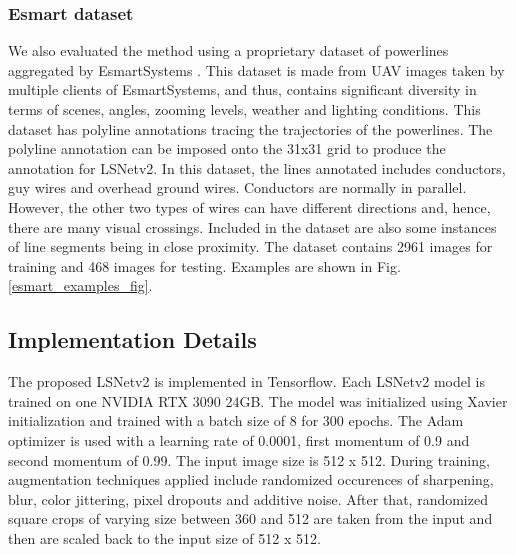 \documentclass[journal]{IEEEtran}
\newcommand{\commentM}[1]{\textbf{\textcolor{blue}{M: #1}}}
\begin{document}
\subsubsection{Esmart dataset}
We also evaluated the method using a proprietary dataset of powerlines aggregated by EsmartSystems \cite{esmart_website}. This dataset is made from UAV images taken by multiple clients of EsmartSystems, and thus, contains significant diversity in terms of scenes, angles, zooming levels, weather and lighting conditions. This dataset has polyline annotations tracing the trajectories of the powerlines. The polyline annotation can be imposed onto the 31x31 grid to produce the annotation for LSNetv2.
In this dataset, the lines annotated includes conductors, guy wires and overhead ground wires. Conductors are normally in parallel. However, the other two types of wires can have different directions and, hence, there are many visual crossings. Included in the dataset are also some instances of line segments being in close proximity. The dataset contains 2961 images for training and 468 images for testing. Examples are shown in Fig. \ref{esmart_examples_fig}.


\subsection{Implementation Details}

The proposed LSNetv2 is implemented in Tensorflow. Each LSNetv2 model is trained on one NVIDIA RTX 3090 24GB. The model was initialized using Xavier initialization \cite{xavier} and trained with a batch size of 8 for 300 epochs. The Adam optimizer \cite{adam} is used with a learning rate of 0.0001, first momentum of 0.9 and second momentum of 0.99. The input image size is 512 x 512. During training, augmentation techniques applied include randomized occurences of sharpening, blur, color jittering, pixel dropouts and additive noise. After that, randomized square crops of varying size between 360 and 512 are taken from the input and then are scaled back to the input size of 512 x 512.
\end{document}
